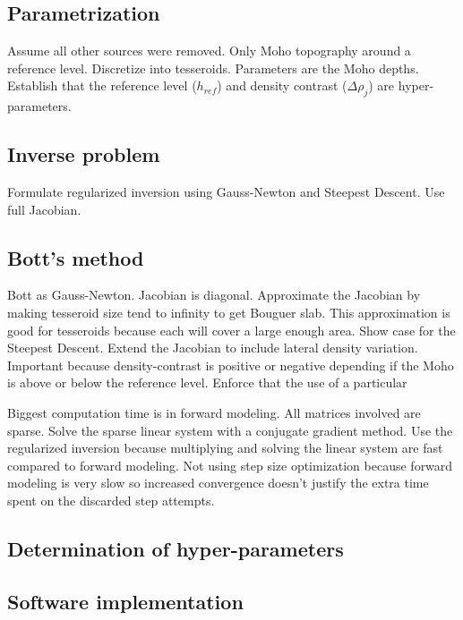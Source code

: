 \documentclass[extra,mreferee]{gji}
\begin{document}
\subsection{Parametrization}


Assume all other sources were removed.
Only Moho topography around a reference level.
Discretize into tesseroids.
Parameters are the Moho depths.
Establish that the reference level ($h_{ref}$)  and density contrast
($\Delta\rho_j$) are hyper-parameters.

\subsection{Inverse problem}

Formulate regularized inversion using Gauss-Newton and Steepest Descent.
Use full Jacobian.

\subsection{Bott's method}

Bott as Gauss-Newton.
Jacobian is diagonal.
Approximate the Jacobian by making tesseroid size tend to infinity to get
Bouguer slab.
This approximation is good for tesseroids because each will cover a large
enough area.
Show case for the Steepest Descent.
Extend the Jacobian to include lateral density variation.
Important because density-contrast is positive or negative depending if the
Moho is above or below the reference level.
Enforce that the use of a particular

Biggest computation time is in forward modeling.
All matrices involved are sparse.
Solve the sparse linear system with a conjugate gradient method.
Use the regularized inversion because multiplying and solving the linear system
are fast compared to forward modeling.
Not using step size optimization because forward modeling is very slow so
increased convergence doesn't justify the extra time spent on the discarded
step attempts.

\subsection{Determination of hyper-parameters}



\subsection{Software implementation}
\end{document}
